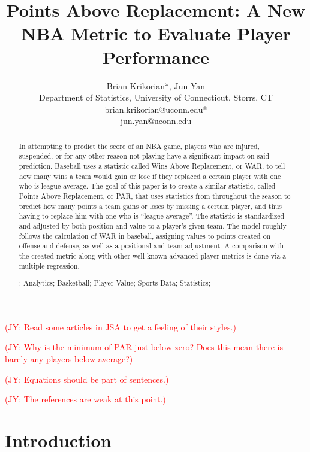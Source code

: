 \documentclass[titlepage, 12pt]{article}
\title{Points Above Replacement: A New NBA Metric to Evaluate Player Performance}
\author{
Brian Krikorian*, Jun Yan \\ \medskip 
Department of Statistics, University of Connecticut, Storrs, CT  \\  \medskip 
brian.krikorian@uconn.edu* \\
 jun.yan@uconn.edu 
}
\newcommand{\jy}[1]{\textcolor{red}{(JY: #1)}}
\begin{document}
\maketitle

\begin{abstract}
In attempting to predict the score of an NBA game, players who are 
injured, suspended, or for any other 
reason not playing have a significant impact on said prediction. Baseball 
uses a statistic called Wins Above 
Replacement, or WAR, to tell how many wins a team would gain or lose if 
they replaced a certain player 
with one who is league average. The goal of this paper is to create a 
similar statistic, called Points Above 
Replacement, or PAR, that uses statistics from throughout the season to 
predict how many points a team 
gains or loses by missing a certain player, and thus having to replace him 
with one who is ``league 
average''. The statistic is standardized and adjusted by both position and 
value to a player's given team. 
The model roughly follows the calculation of WAR in baseball, assigning 
values to points created on offense 
and defense, as well as a positional and team adjustment. A comparison 
with the created metric along with 
other well-known advanced player metrics is done via a multiple 
regression.

\bigskip
{}:
Analytics; Basketball; Player Value; Sports Data; Statistics; 
\end{abstract}



\jy{Read some articles in JSA to get a feeling of their styles.}


\jy{Why is the minimum of PAR just below zero? Does this mean there is barely
  any players below average?}

\jy{Equations should be part of sentences.}

\jy{The references are weak at this point.}


\section{Introduction}
\end{document}
